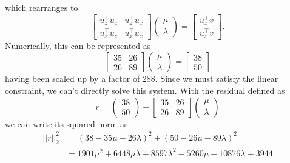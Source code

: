 which rearranges to
\begin{equation*}
    \begin{bmatrix}
        u_z^\top u_z & u_z^\top u_x \\
        u_x^\top u_z & u_x^\top u_x
    \end{bmatrix} \begin{pmatrix}
        \mu \\
        \lambda
    \end{pmatrix} = \begin{bmatrix}
        u_z^\top v \\
        u_x^\top v
    \end{bmatrix}.
\end{equation*}
Numerically, this can be represented as
\begin{equation*}
    \begin{bmatrix}
        35 & 26 \\
        26 & 89
    \end{bmatrix} \begin{pmatrix}
        \mu \\
        \lambda
    \end{pmatrix} = \begin{bmatrix}
        38 \\
        50
    \end{bmatrix}
\end{equation*}
having been scaled up by a factor of $288$.
Since we must satisfy the linear constraint, we can't directly solve this system.
With the residual defined as
\begin{equation*}
    r = \begin{pmatrix}
        38 \\
        50
    \end{pmatrix} - \begin{bmatrix}
        35 & 26 \\
        26 & 89
    \end{bmatrix} \begin{pmatrix}
        \mu \\
        \lambda
    \end{pmatrix}
\end{equation*}
we can write its squared norm as
\begin{align*}
    ||r||_2^2 &= \left( 38 - 35 \mu - 26 \lambda \right)^2 + \left( 50 - 26 \mu - 89 \lambda \right)^2 \\
    &= 1901 \mu^2 + 6448 \mu \lambda + 8597 \lambda^2 - 5260 \mu - 10876 \lambda + 3944
\end{align*}
